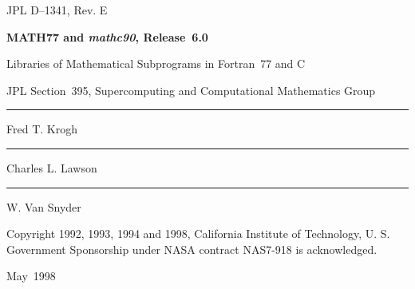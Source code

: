 \documentclass[twoside]{MATH77}
\begin{document}
\begcover
\begin{center}
\begin{minipage}{5.5in}
JPL D--1341, Rev. E

\vspace{1.5in}

{\huge \bf MATH77 and {\em mathc90}, Release~6.0}

\vspace{.25in}
{\LARGE Libraries of Mathematical Subprograms in\newline
Fortran~77 and C}
\vspace{2in}

{\Large JPL Section~395, Supercomputing and\newline
Computational Mathematics Group}\\[20pt]
\rule{.2in}{0pt}Fred T. Krogh\\[5pt]
\rule{.2in}{0pt}Charles L. Lawson\\[5pt]
\rule{.2in}{0pt}W. Van Snyder

\vspace{.4in}

Copyright 1992, 1993, 1994 and 1998, California Institute of
Technology,\newline
U. S. Government Sponsorship under NASA contract NAS7-918 is
acknowledged.

\vspace{.5in}

{\Large May~1998}
\end{minipage}
\end{center}
\newpage
\end{document}
